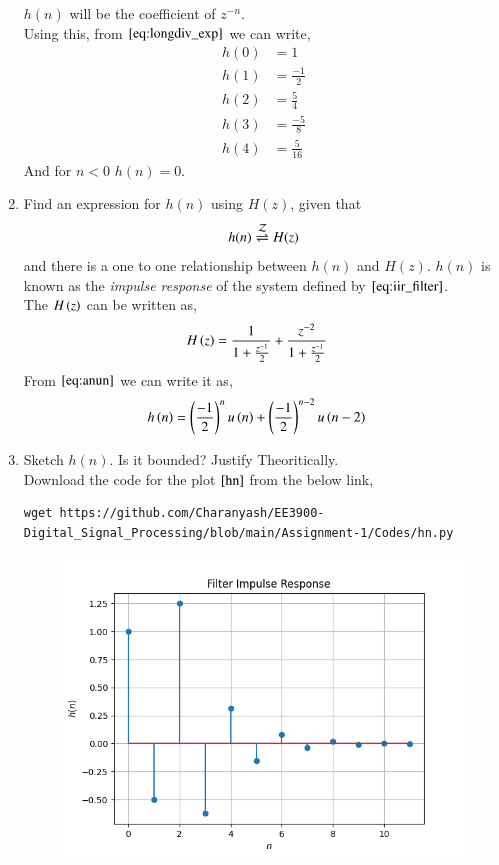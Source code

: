 \documentclass[journal,12pt,twocolumn]{IEEEtran}
\renewcommand\thesection{\arabic{section}}
\begin{document}
\begin{enumerate}[label=\thesection.\arabic*]
    $h(n)$ will be the coefficient of $z^{-n}$.\\
     Using this, from $\eqref{eq:longdiv_exp}$ we can write,
     \begin{align}
      h(0) &= 1\\
      h(1) &= \frac{-1}{2}\\
      h(2) &= \frac{5}{4}\\
      h(3) &= \frac{-5}{8}\\
      h(4) &= \frac{5}{16}
     \end{align}
     And for $n<0\,\, h(n) = 0$.
    \item \label{prob:impulse_resp}
      Find an expression for $h(n)$ using $H(z)$, given that 
      \begin{equation}
        \label{eq:impulse_resp}
        h(n) \overset{\mathcal{Z}}{ \rightleftharpoons} H(z)
      \end{equation}
      and there is a one to one relationship between $h(n)$ and $H(z)$. $h(n)$ is known as the {\em impulse response} of the system defined by $\eqref{eq:iir_filter}$.\\ 
    \solution The $H\left(z\right)$ can be written as,
      \begin{align}
         H\left(z\right) &= \frac{1}{1 + \frac{z^{-1}}{2}} + \frac{z^{-2}}{1+\frac{z^{-1}}{2}}
      \end{align}
      From $\eqref{eq:anun}$ we can write it as,
      \begin{align}
        h\left(n\right) &= \left(\frac{-1}{2}\right)^{n} u\left(n\right) + \left(\frac{-1}{2}\right)^{n-2} u\left(n-2\right)\label{eq:hn}
      \end{align}
    \item Sketch $h(n)$. Is it bounded? Justify Theoritically.\\
    \solution  Download the code for the plot $\ref{hn}$ from the below link,
     \begin{lstlisting}
wget https://github.com/Charanyash/EE3900-Digital_Signal_Processing/blob/main/Assignment-1/Codes/hn.py
     \end{lstlisting}
     \begin{figure}[ht!]
      \centering
      \includegraphics[width = \columnwidth]{Figs/hn.png}

\end{figure}
\end{enumerate}
\end{document}
